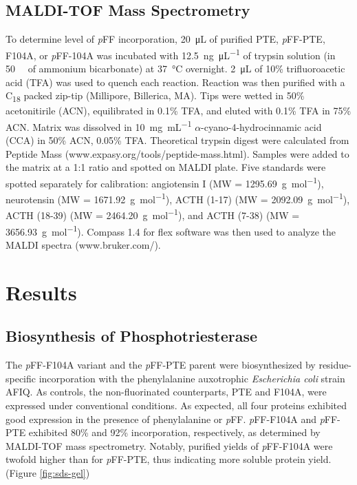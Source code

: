 \begin{refsection}
\subsection{MALDI-TOF Mass Spectrometry}

To determine level of \emph{p}FF incorporation, \SI{20}{\micro\liter} of
purified PTE, \emph{p}FF-PTE, F104A, or \emph{p}FF-104A was incubated with
\SI{12.5}{\ng\per\uL} of trypsin solution (in \SI{50}{\milli\Molar} of ammonium
bicarbonate) at \SI{37}{\celsius} overnight. \SI{2}{\uL} of 10\%
trifluoroacetic acid (TFA) was used to quench each reaction. Reaction was then
purified with a C\textsubscript{18} packed zip-tip (Millipore, Billerica, MA).
Tips were wetted in 50\% acetonitirile (ACN), equilibrated in 0.1\% TFA, and
eluted with 0.1\% TFA in 75\% ACN. Matrix was dissolved in \SI{10}{\mg\per\mL}
$\alpha$-cyano-4-hydrocinnamic acid (CCA) in 50\% ACN, 0.05\% TFA. Theoretical
trypsin digest were calculated from Peptide Mass
(www.expasy.org/tools/peptide-mass.html). Samples were added to the matrix at a
1:1 ratio and spotted on MALDI plate. Five standards were spotted separately
for calibration: angiotensin I (MW = \SI{1295.69}{\g\per\mole}), neurotensin
(MW = \SI{1671.92}{\g\per\mole}), ACTH (1-17) (MW = \SI{2092.09}{\g\per\mole}),
ACTH (18-39) (MW = \SI{2464.20}{\g\per\mole}), and ACTH (7-38) (MW =
\SI{3656.93}{\g\per\mole}).  Compass 1.4 for flex software was then used to
analyze the MALDI spectra (www.bruker.com/).

\section{Results}

\subsection{Biosynthesis of Phosphotriesterase}

The \emph{p}FF-F104A variant and the \emph{p}FF-PTE parent were biosynthesized
by residue-specific incorporation with the phenylalanine auxotrophic
\emph{Escherichia coli} strain AFIQ\cite{Yang2014a}. As controls, the
non-fluorinated counterparts, PTE and F104A, were expressed under conventional
conditions. As expected, all four proteins exhibited good expression in the
presence of phenylalanine or \emph{p}FF. \emph{p}FF-F104A and \emph{p}FF-PTE
exhibited 80\% and 92\% incorporation, respectively, as determined by MALDI-TOF
mass spectrometry. Notably, purified yields of \emph{p}FF-F104A were twofold
higher than for \emph{p}FF-PTE, thus indicating more soluble protein yield.
(Figure \ref{fig:sds-gel})


\end{refsection}
